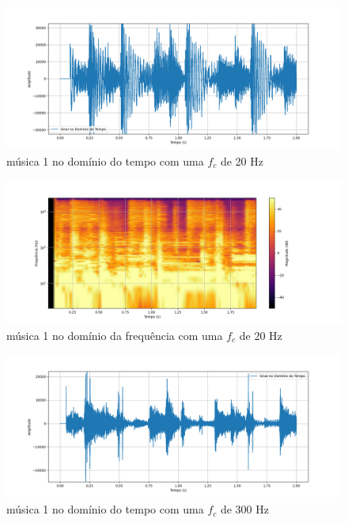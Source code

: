 \begin{anexosenv}
\begin{figure}[h]
	\centering
    \includegraphics[width=\textwidth]{figuras/fig24.png}
	\caption{música 1 no domínio do tempo com uma $f_c$ de 20 Hz}
	\label{fig24}
\end{figure}

\begin{figure}[h]
	\centering
    \includegraphics[width=\textwidth]{figuras/fig25.png}
	\caption{música 1 no domínio da frequência com uma $f_c$ de 20 Hz}
	\label{fig25}
\end{figure}

\begin{figure}[h]
	\centering
    \includegraphics[width=\textwidth]{figuras/fig28.png}
	\caption{música 1 no domínio do tempo com uma $f_c$ de 300 Hz}
	\label{fig28}
\end{figure}


\end{anexosenv}
